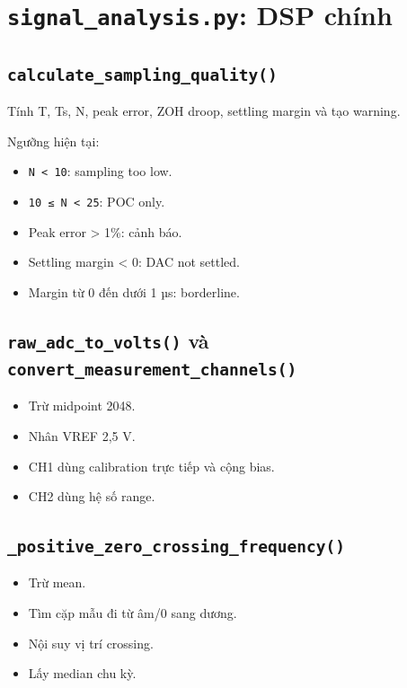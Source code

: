 \documentclass[12pt,a4paper,oneside]{article}
\newcommand{\inlinecode}[1]{\texttt{#1}}
\begin{document}
\section{\inlinecode{signal\_analysis.py}: DSP chính}

\subsection{\inlinecode{calculate\_sampling\_quality()}}

Tính T, Ts, N, peak error, ZOH droop, settling margin và tạo warning.

Ngưỡng hiện tại:

\begin{itemize}
\item \inlinecode{N \textless{} 10}: sampling too low.
\item \inlinecode{10 ≤ N \textless{} 25}: POC only.
\item Peak error \textgreater{} 1\%: cảnh báo.
\item Settling margin \textless{} 0: DAC not settled.
\item Margin từ 0 đến dưới 1 µs: borderline.
\end{itemize}

\subsection{\inlinecode{raw\_adc\_to\_volts()} và \inlinecode{convert\_measurement\_channels()}}

\begin{itemize}
\item Trừ midpoint 2048.
\item Nhân VREF 2,5 V.
\item CH1 dùng calibration trực tiếp và cộng bias.
\item CH2 dùng hệ số range.
\end{itemize}

\subsection{\inlinecode{\_positive\_zero\_crossing\_frequency()}}

\begin{itemize}
\item Trừ mean.
\item Tìm cặp mẫu đi từ âm/0 sang dương.
\item Nội suy vị trí crossing.
\item Lấy median chu kỳ.
\end{itemize}
\end{document}
